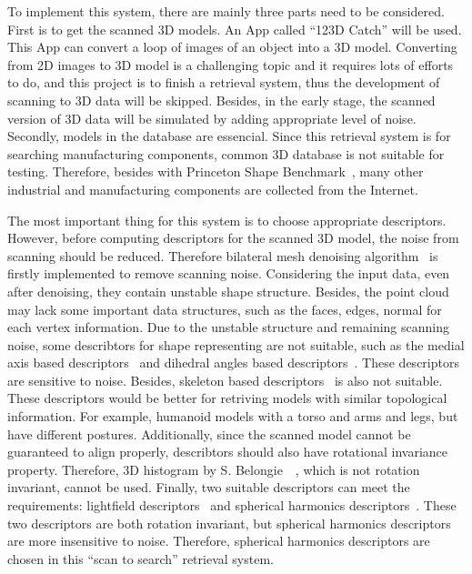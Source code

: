 To implement this system, there are mainly three parts need to be considered. First is to get the scanned 3D models. An App called ``123D Catch'' will be used. This App can convert a loop of images of an object into a 3D model. Converting from 2D images to 3D model is a challenging topic and it requires lots of efforts to do, and this project is to finish a retrieval system, thus the development of scanning to 3D data will be skipped. Besides, in the early stage, the scanned version of 3D data will be simulated by adding appropriate level of noise. Secondly, models in the database are essencial. Since this retrieval system is for searching  manufacturing components, common 3D database is not suitable for testing. Therefore, besides with  Princeton Shape Benchmark~\cite{shilane2004princeton}, many other industrial and manufacturing components are collected from the Internet.

The most important thing for this system is to choose appropriate descriptors. However, before computing descriptors for the scanned 3D model, the noise from scanning should be reduced. Therefore bilateral mesh denoising algorithm~\cite{fleishman2003bilateral} is firstly implemented to remove scanning noise. Considering the input data, even after denoising, they contain unstable shape structure. Besides, the point cloud may lack some important data structures, such as the faces, edges, normal for each vertex information. Due to the unstable structure and remaining scanning noise, some describtors for shape representing are not suitable, such as the medial axis based descriptors~\cite{kim2001graph} and dihedral angles based descriptors~\cite{gal2009iwires}. These descriptors are sensitive to noise. Besides, skeleton based descriptors~\cite{sundar2003skeleton} is also not suitable. These descriptors would be better for retriving models with similar topological information. For example, humanoid models with a torso and arms and legs, but have different postures. Additionally, since the scanned model cannot be guaranteed to align properly, describtors should also have rotational invariance property. Therefore, 3D histogram by S. Belongie~\etal~\cite{belongie2002shape}, which is not rotation invariant, cannot be used. Finally, two suitable descriptors can meet the requirements: lightfield descriptors~\cite{shen20033d} and spherical harmonics descriptors~\cite{Funkhouser:2003:SEM:588272.588279}. These two descriptors are both rotation invariant, but spherical harmonics descriptors are more insensitive to noise. Therefore, spherical harmonics descriptors are chosen in this ``scan to search'' retrieval system. 

